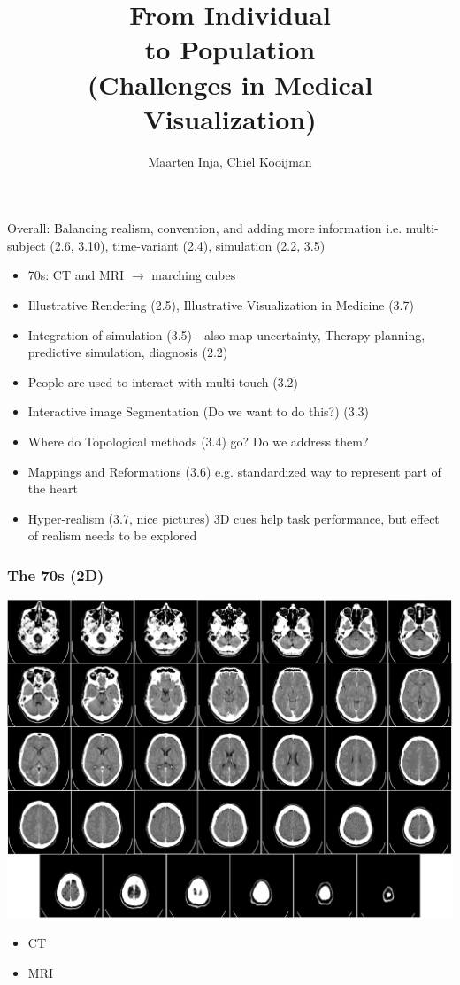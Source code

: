 \documentclass{beamer}
\title{From Individual\\to Population\\\Large (Challenges in Medical Visualization)}
\author{Maarten Inja, Chiel Kooijman}
\begin{document}
\begin{frame}
	\maketitle
\end{frame}

\begin{frame}
	Overall: Balancing realism, convention, and adding more information i.e.
	multi-subject (2.6, 3.10), time-variant (2.4), simulation (2.2, 3.5)\\
	
	\begin{itemize}
		\item 70s: CT and MRI $\rightarrow$ marching cubes\\
		\item Illustrative Rendering (2.5), Illustrative Visualization in
			Medicine (3.7)\\
		\item Integration of simulation (3.5) - also map uncertainty, Therapy
			planning, predictive simulation, diagnosis (2.2)\\

		\item People are used to interact with multi-touch (3.2)\\

		\item Interactive image Segmentation (Do we want to do this?) (3.3)\\

		\item Where do Topological methods (3.4) go? Do we address them?

		\item Mappings and Reformations (3.6) e.g. standardized way to
			represent part of the heart\\

		\item Hyper-realism (3.7, nice pictures) 3D cues help task performance,
			but effect of realism needs to be explored
	\end{itemize}
\end{frame}

\begin{frame}
	\frametitle{The 70s (2D)}
	\begin{center}
		\includegraphics[width=.6\textwidth]{images/ct}
	\end{center}
	\begin{itemize}
		\item CT
		\item MRI
	\end{itemize}
\end{frame}
\end{document}
